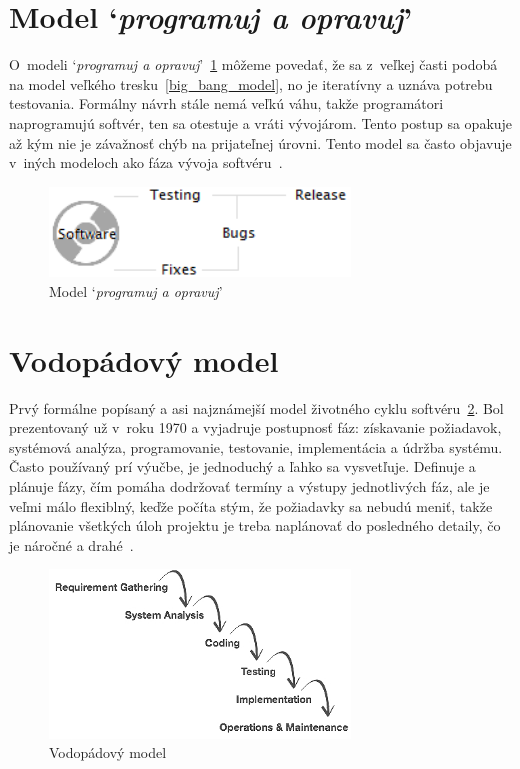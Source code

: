 \section{Model `\textit{programuj a opravuj}'}
\label{code_fix_model}
O~modeli `\textit{programuj a opravuj}'~\ref{code_fix_model_fig} môžeme povedať, že sa z~veľkej časti podobá na model veľkého tresku~\ref{big_bang_model}, no je iteratívny a uznáva potrebu testovania.
Formálny návrh stále nemá veľkú váhu, takže programátori naprogramujú softvér, ten sa otestuje a vráti vývojárom.
Tento postup sa opakuje až kým nie je závažnosť chýb na prijateľnej úrovni.
Tento model sa často objavuje v~iných modeloch ako fáza vývoja softvéru~\cite{Patton}.
\begin{figure}[h]
\centering
\includegraphics[width=8cm,keepaspectratio=true]{obrazky/code_fix_model.png}
\caption{Model `\textit{programuj a opravuj}'~\cite{models}}
\label{code_fix_model_fig}
\end{figure}

\section{Vodopádový model}
\label{waterfall_model}
Prvý formálne popísaný a asi najznámejší model životného cyklu softvéru~\ref{waterfall_model_fig}.
Bol prezentovaný už v~roku 1970 a vyjadruje postupnosť fáz: získavanie požiadavok, systémová analýza, programovanie, testovanie, implementácia a údržba systému.
Často používaný prí výučbe, je jednoduchý a ľahko sa vysvetľuje.
Definuje a plánuje fázy, čím pomáha dodržovať termíny a výstupy jednotlivých fáz, ale je veľmi málo flexiblný, keďže počíta stým, že požiadavky sa nebudú meniť, takže plánovanie všetkých úloh projektu je treba naplánovať do posledného detaily, čo je náročné a drahé~\cite{Patton}.
\begin{figure}[h]
\centering
\includegraphics[width=8cm,keepaspectratio=true]{obrazky/waterfall_model.png}
\caption{Vodopádový model~\cite{models}}
\label{waterfall_model_fig}
\end{figure}

